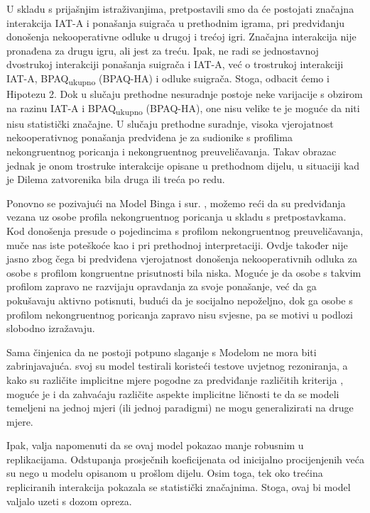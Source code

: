 \documentclass[a4paper, 12pt]{report}
\begin{document}
U skladu s prijašnjim istraživanjima,
pretpostavili smo da će postojati značajna interakcija IAT-A i ponašanja
suigrača u prethodnim igrama, pri predviđanju donošenja nekooperativne odluke u
drugoj i trećoj igri. Značajna interakcija nije pronađena za drugu igru, ali
jest za treću. Ipak, ne radi se jednostavnoj dvostrukoj interakciji ponašanja
suigrača i IAT-A, već o trostrukoj interakciji IAT-A, BPAQ\textsubscript{ukupno}
(BPAQ-HA) i odluke suigrača. Stoga, odbacit ćemo i Hipotezu 2.
Dok u slučaju prethodne nesuradnje postoje neke varijacije s
obzirom na razinu IAT-A i BPAQ\textsubscript{ukupno} (BPAQ-HA), one nisu velike
te je moguće da niti nisu statistički značajne. U slučaju prethodne suradnje, 
visoka vjerojatnost nekooperativnog ponašanja predviđena je za sudionike s
profilima nekongruentnog poricanja i nekongruentnog preuveličavanja. Takav
obrazac jednak je onom trostruke interakcije opisane u prethodnom dijelu, u
situaciji kad je Dilema zatvorenika bila druga ili treća po redu.

Ponovno se pozivajući na Model Binga i sur. \citeyearpar{bing2007integrating},
možemo reći da su predviđanja vezana uz osobe profila nekongruentnog
poricanja u skladu s pretpostavkama. Kod donošenja presude o pojedincima s
profilom nekongruentnog preuveličavanja, muče nas iste poteškoće kao i pri
prethodnoj interpretaciji. Ovdje također nije jasno zbog čega bi predviđena
vjerojatnost donošenja nekooperativnih odluka za osobe s profilom kongruentne
prisutnosti bila niska.
Moguće je da osobe s takvim profilom zapravo
ne razvijaju opravdanja za svoje ponašanje, već da ga pokušavaju aktivno
potisnuti, budući da je socijalno nepoželjno, dok ga osobe s profilom
nekongruentnog poricanja zapravo nisu svjesne, pa se motivi u podlozi slobodno
izražavaju. 

Sama činjenica da ne postoji potpuno slaganje s Modelom ne mora biti
zabrinjavajuća. \citet{bing2007integrating} svoj su model testirali koristeći
testove uvjetnog rezoniranja, a kako su različite implicitne mjere pogodne za
predviđanje različitih kriterija \citep{uhlmann2012getting}, moguće je i da
zahvaćaju različite aspekte implicitne ličnosti te da se modeli temeljeni na
jednoj mjeri (ili jednoj paradigmi) ne mogu generalizirati na druge mjere.

Ipak, valja napomenuti da se ovaj model pokazao manje robusnim u replikacijama.
Odstupanja prosječnih koeficijenata od inicijalno procijenjenih veća su nego u
modelu opisanom u prošlom dijelu. Osim toga, tek oko trećina repliciranih
interakcija pokazala se statistički značajnima. Stoga, ovaj bi model valjalo
uzeti s dozom opreza. 
\end{document}
